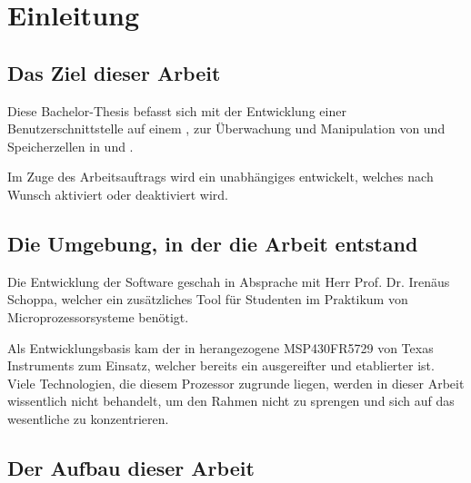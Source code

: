 
\chapter{Einleitung}
\label{cha:Einleitung}


\section{Das Ziel dieser Arbeit}
\label{sec:ZielDerArbeit}

Diese Bachelor-Thesis befasst sich mit der Entwicklung einer  Benutzerschnittstelle auf einem , zur \"Uberwachung und Manipulation von  und Speicherzellen in  und .

Im Zuge des Arbeitsauftrags wird ein unabh\"angiges  entwickelt, welches nach Wunsch aktiviert oder deaktiviert wird.


\section{Die Umgebung, in der die Arbeit entstand}
\label{sec:EntstehungsUmgebungArbeit}

Die Entwicklung der Software geschah in Absprache mit Herr Prof. Dr. Iren\"aus Schoppa, welcher ein zus\"atzliches Tool f\"ur Studenten im Praktikum von Microprozessorsysteme ben\"otigt.

Als Entwicklungsbasis kam der in  herangezogene MSP430FR5729 von Texas Instruments zum Einsatz, welcher bereits ein ausgereifter und etablierter  ist. Viele Technologien, die diesem Prozessor zugrunde liegen, werden in dieser Arbeit wissentlich nicht behandelt, um den Rahmen nicht zu sprengen und sich auf das wesentliche zu konzentrieren.


\section{Der Aufbau dieser Arbeit}
\label{sec:AufbauDieserArbeit}

